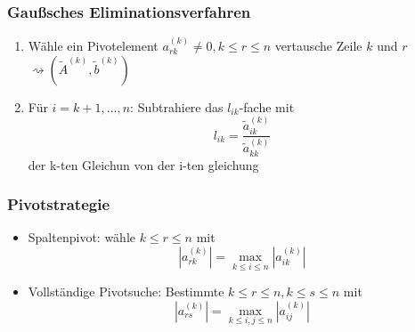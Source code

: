 \documentclass[
	ngerman,
	accentcolor=9c,%
	type=intern,
	marginpar=false
	]{tudapub}
\begin{document}
            \subsubsection{Gaußsches Eliminationsverfahren}
                \begin{enumerate}
                    \item Wähle ein Pivotelement $a^{(k)}_{rk} \not= 0, k\leq r\leq n$ vertausche Zeile $k$ und $r$ $\rightsquigarrow (\tilde{A}^{(k)}, \tilde{b}^{(k)}) $
                    \item Für $i=k+1, \dots, n$: 
                    Subtrahiere das $l_{ik}$-fache mit
                    \begin{equation*}
                        l_{ik} = \dfrac{\tilde{a}^{(k)}_{ik}}{\tilde{a}^{(k)}_{kk}}
                    \end{equation*}
                    der k-ten Gleichun von der i-ten gleichung
                \end{enumerate}
            \subsubsection{Pivotstrategie}
            \begin{itemize}
                \item Spaltenpivot: wähle $k\leq r \leq n$ mit 
                    \begin{equation*}
                        |a^{(k)}_{rk}| = \max_{k\leq i \leq n} |a^{(k)}_{ik}|
                    \end{equation*}
                \item  Vollständige Pivotsuche: Bestimmte $k\leq r \leq n, k\leq s \leq n$ mit 
                    \begin{equation*}
                        |a^{(k)}_{rs}| = \max_{k\leq i,j \leq n} |a^{(k)}_{ij}|
                    \end{equation*}
            \end{itemize}
\end{document}
